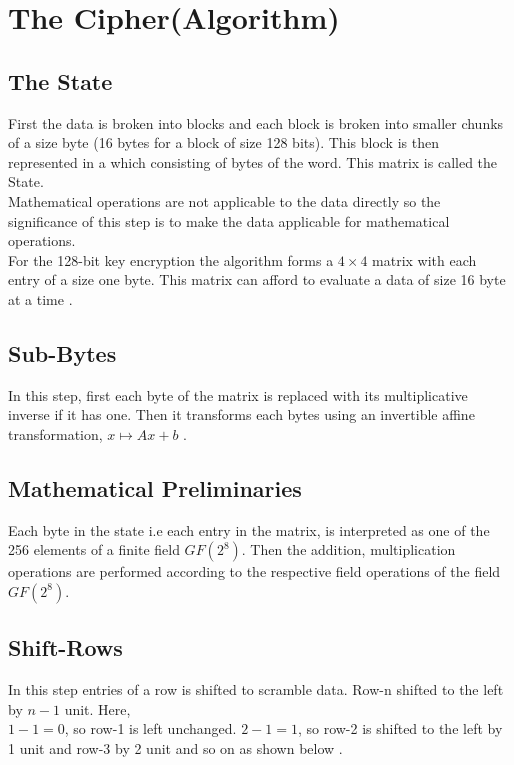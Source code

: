 \vspace{7mm}
\section{The Cipher(Algorithm)}
\subsection{The State}
First the data is broken into blocks and each block is broken into smaller chunks of a size byte (16 bytes for a block of size 128 bits). This block is then represented in a  which consisting of bytes of the word. This matrix is called the State.\\
Mathematical operations are not applicable to the data directly so the significance of this step is to make the data applicable for mathematical operations.\\
For the 128-bit key encryption the algorithm forms a \(4 \times 4\) matrix with each entry of a size one byte. This matrix can afford to evaluate a data of size 16 byte at a time \cite{aes}.

\vspace{3mm}
\subsection{Sub-Bytes}
In this step, first each byte of the matrix is replaced with its multiplicative inverse if it has one. Then it transforms each bytes using an invertible affine transformation, \(x \mapsto Ax+b\) \cite{aes}.

\subsection{ Mathematical Preliminaries}
Each byte in the state i.e each entry in the matrix, is interpreted as one of the 256 elements of a finite field \(GF(2^8)\). Then the addition, multiplication operations are performed according to the respective field operations of the field \(GF(2^8)\).

\vspace{3mm}
\subsection{Shift-Rows}
In this step entries of a row is shifted to scramble data. Row-n shifted to the left by \(n-1\) unit. Here,\\
\(1-1=0\), so row-1 is left unchanged. \(2-1=1\), so row-2 is shifted to the left by 1 unit and row-3 by 2 unit and so on as shown below \cite{aes}.

